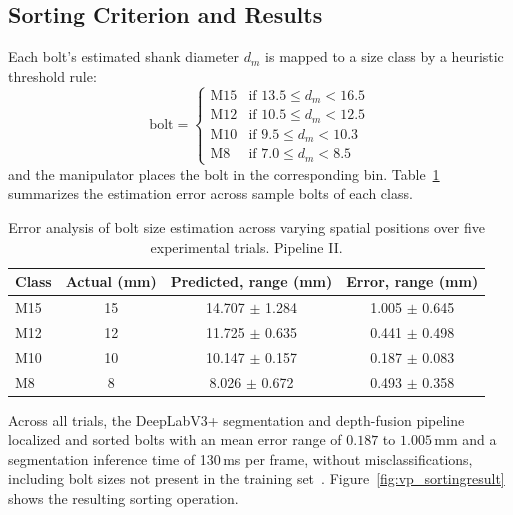 \subsection{Sorting Criterion and Results}\label{subsec:vp_results2}

Each bolt's estimated shank diameter $d_m$ is mapped to a size class by a heuristic threshold rule:
\begin{equation}
\mathrm{bolt} =
\begin{cases}
\mathrm{M15} & \text{if } 13.5 \leq d_m < 16.5 \\
\mathrm{M12} & \text{if } 10.5 \leq d_m < 12.5 \\
\mathrm{M10} & \text{if } 9.5 \leq d_m < 10.3 \\
\mathrm{M8}  & \text{if } 7.0 \leq d_m < 8.5
\end{cases}
\label{eq:vp_sortrule}
\end{equation}
and the manipulator places the bolt in the corresponding bin. Table~\ref{tab:vp_sizeerror}
summarizes the estimation error across sample bolts of each class.

\begin{table}[htbp]
\centering
\caption{Error analysis of bolt size estimation across varying spatial positions over five experimental trials. Pipeline II.}
\label{tab:vp_sizeerror}
\begin{tabular}{lccc}
\toprule
\textbf{Class} & \textbf{Actual (mm)} & \textbf{Predicted, range (mm)} & \textbf{Error, range (mm)} \\
\midrule
M15 & 15 & 14.707 $\pm$ 1.284 & 1.005 $\pm$ 0.645\\
M12 & 12 & 11.725 $\pm$ 0.635 & 0.441 $\pm$ 0.498\\
M10 & 10 & 10.147 $\pm$ 0.157 & 0.187 $\pm$ 0.083\\
M8  & 8  & 8.026 $\pm$ 0.672  & 0.493 $\pm$ 0.358\\
\bottomrule
\end{tabular}
\end{table}

Across all trials, the DeepLabV3+ segmentation and depth-fusion pipeline localized and sorted bolts
with an mean error range of $0.187$ to $1.005$\,mm and a segmentation inference time of 130\,ms per
frame, without misclassifications, including bolt sizes not present in the training
set~\citep{sk2024boltsorting}. Figure~\ref{fig:vp_sortingresult} shows the resulting sorting
operation.

